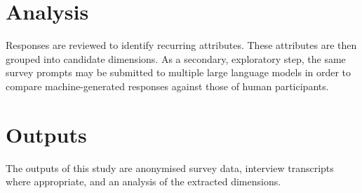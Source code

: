 \section{Analysis}
Responses are reviewed to identify recurring attributes. These attributes are then grouped into candidate dimensions. As a secondary, exploratory step, the same survey prompts may be submitted to multiple large language models in order to compare machine-generated responses against those of human participants.

\section{Outputs}
The outputs of this study are anonymised survey data, interview transcripts where appropriate, and an analysis of the extracted dimensions.

